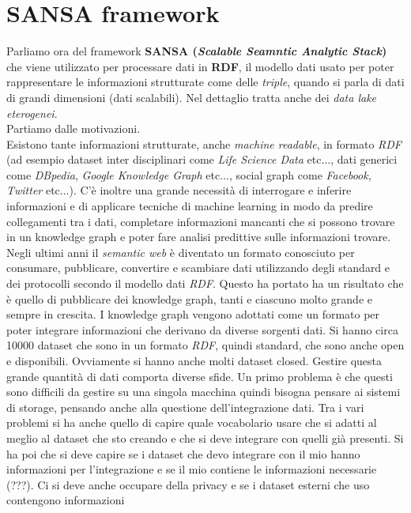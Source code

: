 \documentclass[a4paper,12pt, oneside]{book}
\begin{document}
\section{SANSA framework}
Parliamo ora del framework \textbf{SANSA (\textit{Scalable Seamntic Analytic
    Stack})} che viene utilizzato per processare 
dati in \textbf{RDF}, il modello dati usato per poter rappresentare le
informazioni strutturate come delle \textit{triple}, quando si parla di dati di
grandi dimensioni (dati scalabili). Nel dettaglio tratta anche dei \textit{data
  lake eterogenei}.\\
Partiamo dalle motivazioni. \\
Esistono tante informazioni strutturate, anche \textit{machine readable}, in
formato \textit{RDF} (ad esempio dataset inter disciplinari come \textit{Life
  Science Data} etc$\ldots$, dati generici come \textit{DBpedia}, \textit{Google
Knowledge Graph} etc$\ldots$, social graph come \textit{Facebook, Twitter}
etc$\ldots$). C'è inoltre una grande necessità di interrogare e inferire
informazioni e di applicare tecniche di machine learning in modo da predire
collegamenti tra i dati, completare informazioni mancanti che si possono trovare
in un knowledge graph e poter fare analisi predittive sulle informazioni
trovare.\\
Negli ultimi anni il \textit{semantic web} è diventato un formato conosciuto per
consumare, pubblicare, convertire e scambiare dati utilizzando degli standard e
dei protocolli secondo il modello dati \textit{RDF}. Questo ha portato ha un
risultato che è quello di pubblicare dei knowledge graph, tanti e ciascuno molto
grande e sempre in crescita. I knowledge graph vengono adottati come un formato
per poter integrare informazioni che derivano da diverse sorgenti dati. Si hanno
circa 10000 dataset che sono in un formato \textit{RDF}, quindi standard, che
sono anche open e disponibili. Ovviamente si hanno anche molti dataset
closed. Gestire questa grande quantità di dati comporta diverse sfide. Un primo
problema è che questi sono difficili da gestire su una singola macchina quindi
bisogna pensare ai sistemi di storage, pensando anche alla questione
dell'integrazione dati. Tra i vari problemi si ha anche quello di capire quale
vocabolario usare che si adatti al meglio al dataset che sto creando e che si
deve integrare con quelli già presenti. Si ha poi che si deve capire se i
dataset che devo integrare con il mio hanno informazioni per l'integrazione
e se il mio contiene le informazioni necessarie (???). Ci si deve anche occupare
della privacy e se i dataset esterni che uso contengono informazioni
\end{document}
